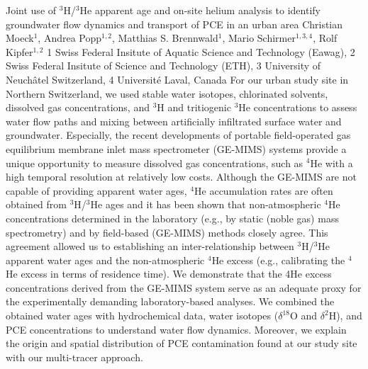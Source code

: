 \begin{conf-abstract}
{Joint use of $^3$H/$^3$He apparent age and on-site helium analysis to identify groundwater flow dynamics and transport of PCE in an urban area}
{Christian Moeck$^1$, Andrea Popp$^{1,2}$, Matthias S. Brennwald$^1$, Mario Schirmer$^{1,3,4}$, Rolf Kipfer$^{1,2}$}
{1 Swiss Federal Insitute of Aquatic Science and Technology (Eawag), 2 Swiss Federal Insitute of Science and Technology (ETH), 3 University of Neuchâtel Switzerland, 4 Université Laval, Canada}
{For our urban study site in Northern Switzerland, we used stable water isotopes, chlorinated solvents, dissolved gas concentrations, and $^3$H and tritiogenic $^3$He concentrations to assess water flow paths and mixing between artificially infiltrated surface water and groundwater. Especially, the recent developments of portable field-operated gas equilibrium membrane inlet mass spectrometer (GE-MIMS) systems provide a unique opportunity to measure dissolved gas concentrations, such as $^4$He with a high temporal resolution at relatively low costs. Although the GE-MIMS are not capable of providing apparent water ages, $^4$He accumulation rates are often obtained from $^3$H/$^3$He ages and it has been shown that non-atmospheric $^4$He concentrations determined in the laboratory (e.g., by static (noble gas) mass spectrometry) and by field-based (GE-MIMS) methods closely agree. This agreement allowed us to establishing an inter-relationship between $^3$H/$^3$He apparent water ages and the non-atmospheric $^4$He excess (e.g., calibrating the $^4$He excess in terms of residence time). We demonstrate that the 4He excess concentrations derived from the GE-MIMS system serve as an adequate proxy for the experimentally demanding laboratory-based analyses. We combined the obtained water ages with hydrochemical data, water isotopes ($\delta^{18}$O and $\delta^{2}$H), and PCE concentrations to understand water flow dynamics. Moreover, we explain the origin and spatial distribution of PCE contamination found at our study site with our multi-tracer approach.}
\end{conf-abstract}
